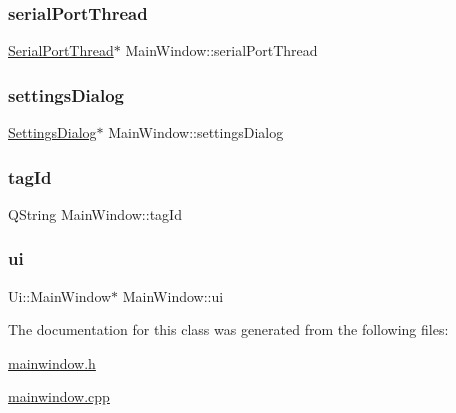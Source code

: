 \mbox{\label{class_main_window_aa9781bbd758a56ac8b1a58d4295aef54}} 
\subsubsection{\texorpdfstring{serialPortThread}{serialPortThread}}
{\footnotesize\ttfamily \mbox{\hyperlink{class_serial_port_thread}{Serial\+Port\+Thread}}$\ast$ Main\+Window\+::serial\+Port\+Thread\hspace{0.3cm}{\ttfamily [private]}}

\mbox{\label{class_main_window_aef5f3e9b117558b9c1d633231bd0d833}} 
\subsubsection{\texorpdfstring{settingsDialog}{settingsDialog}}
{\footnotesize\ttfamily \mbox{\hyperlink{class_settings_dialog}{Settings\+Dialog}}$\ast$ Main\+Window\+::settings\+Dialog\hspace{0.3cm}{\ttfamily [private]}}

\mbox{\label{class_main_window_aab96767ee78290ec955f98371500969f}} 
\subsubsection{\texorpdfstring{tagId}{tagId}}
{\footnotesize\ttfamily Q\+String Main\+Window\+::tag\+Id\hspace{0.3cm}{\ttfamily [private]}}

\mbox{\label{class_main_window_a35466a70ed47252a0191168126a352a5}} 
\subsubsection{\texorpdfstring{ui}{ui}}
{\footnotesize\ttfamily Ui\+::\+Main\+Window$\ast$ Main\+Window\+::ui\hspace{0.3cm}{\ttfamily [private]}}



The documentation for this class was generated from the following files\+:\begin{DoxyCompactItemize}
\item 
\mbox{\hyperlink{mainwindow_8h}{mainwindow.\+h}}\item 
\mbox{\hyperlink{mainwindow_8cpp}{mainwindow.\+cpp}}\end{DoxyCompactItemize}
